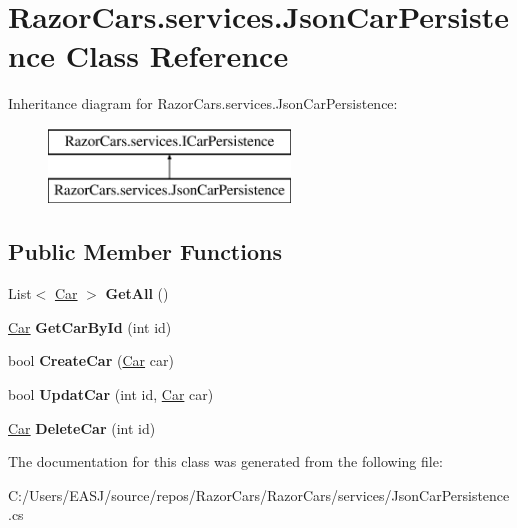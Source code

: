 \hypertarget{class_razor_cars_1_1services_1_1_json_car_persistence}{}\section{Razor\+Cars.\+services.\+Json\+Car\+Persistence Class Reference}
\label{class_razor_cars_1_1services_1_1_json_car_persistence}
Inheritance diagram for Razor\+Cars.\+services.\+Json\+Car\+Persistence\+:\begin{figure}[H]
\begin{center}
\leavevmode
\includegraphics[height=2.000000cm]{class_razor_cars_1_1services_1_1_json_car_persistence}
\end{center}
\end{figure}
\subsection*{Public Member Functions}
\begin{DoxyCompactItemize}
\item 
\mbox{\label{class_razor_cars_1_1services_1_1_json_car_persistence_a61c1747ef9394434f3e6d9cb0931ab14}} 
List$<$ \mbox{\hyperlink{class_razor_cars_1_1model_1_1_car}{Car}} $>$ {\bfseries Get\+All} ()
\item 
\mbox{\label{class_razor_cars_1_1services_1_1_json_car_persistence_a3998e84754f52c82a692de38436e2495}} 
\mbox{\hyperlink{class_razor_cars_1_1model_1_1_car}{Car}} {\bfseries Get\+Car\+By\+Id} (int id)
\item 
\mbox{\label{class_razor_cars_1_1services_1_1_json_car_persistence_a84e6d0c33e400a7a864165db96299034}} 
bool {\bfseries Create\+Car} (\mbox{\hyperlink{class_razor_cars_1_1model_1_1_car}{Car}} car)
\item 
\mbox{\label{class_razor_cars_1_1services_1_1_json_car_persistence_a9d574c21f53f90c272d81f9ec1d8278c}} 
bool {\bfseries Updat\+Car} (int id, \mbox{\hyperlink{class_razor_cars_1_1model_1_1_car}{Car}} car)
\item 
\mbox{\label{class_razor_cars_1_1services_1_1_json_car_persistence_ae5906f5e8abde369e7e448e3fddfad07}} 
\mbox{\hyperlink{class_razor_cars_1_1model_1_1_car}{Car}} {\bfseries Delete\+Car} (int id)
\end{DoxyCompactItemize}


The documentation for this class was generated from the following file\+:\begin{DoxyCompactItemize}
\item 
C\+:/\+Users/\+E\+A\+S\+J/source/repos/\+Razor\+Cars/\+Razor\+Cars/services/Json\+Car\+Persistence.\+cs\end{DoxyCompactItemize}
